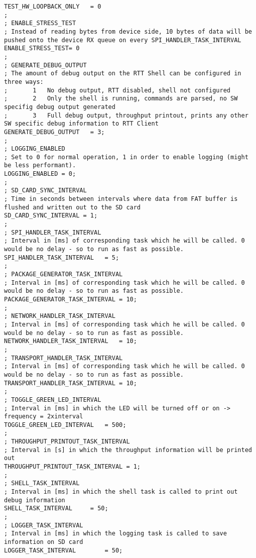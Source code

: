 \begin{lstlisting}
TEST_HW_LOOPBACK_ONLY	= 0
;
; ENABLE_STRESS_TEST
; Instead of reading bytes from device side, 10 bytes of data will be pushed onto the device RX queue on every SPI_HANDLER_TASK_INTERVAL
ENABLE_STRESS_TEST= 0
;
; GENERATE_DEBUG_OUTPUT
; The amount of debug output on the RTT Shell can be configured in three ways:
;		1	No debug output, RTT disabled, shell not configured
;		2	Only the shell is running, commands are parsed, no SW specifig debug output generated
;		3	Full debug output, throughput printout, prints any other SW specific debug information to RTT Client
GENERATE_DEBUG_OUTPUT	= 3;
;
; LOGGING_ENABLED
; Set to 0 for normal operation, 1 in order to enable logging (might be less performant).
LOGGING_ENABLED	= 0;
;
; SD_CARD_SYNC_INTERVAL
; Time in seconds between intervals where data from FAT buffer is flushed and written out to the SD card
SD_CARD_SYNC_INTERVAL = 1;
;
; SPI_HANDLER_TASK_INTERVAL
; Interval in [ms] of corresponding task which he will be called. 0 would be no delay - so to run as fast as possible.
SPI_HANDLER_TASK_INTERVAL	= 5;
;
; PACKAGE_GENERATOR_TASK_INTERVAL
; Interval in [ms] of corresponding task which he will be called. 0 would be no delay - so to run as fast as possible.
PACKAGE_GENERATOR_TASK_INTERVAL	= 10;
;
; NETWORK_HANDLER_TASK_INTERVAL
; Interval in [ms] of corresponding task which he will be called. 0 would be no delay - so to run as fast as possible.
NETWORK_HANDLER_TASK_INTERVAL	= 10;
;
; TRANSPORT_HANDLER_TASK_INTERVAL
; Interval in [ms] of corresponding task which he will be called. 0 would be no delay - so to run as fast as possible.
TRANSPORT_HANDLER_TASK_INTERVAL	= 10;
;
; TOGGLE_GREEN_LED_INTERVAL
; Interval in [ms] in which the LED will be turned off or on -> frequency = 2xinterval
TOGGLE_GREEN_LED_INTERVAL	= 500;
;
; THROUGHPUT_PRINTOUT_TASK_INTERVAL
; Interval in [s] in which the throughput information will be printed out
THROUGHPUT_PRINTOUT_TASK_INTERVAL = 1;
;
; SHELL_TASK_INTERVAL
; Interval in [ms] in which the shell task is called to print out debug information
SHELL_TASK_INTERVAL		= 50;
;
; LOGGER_TASK_INTERVAL
; Interval in [ms] in which the logging task is called to save information on SD card
LOGGER_TASK_INTERVAL		= 50;
\end{lstlisting}
    
